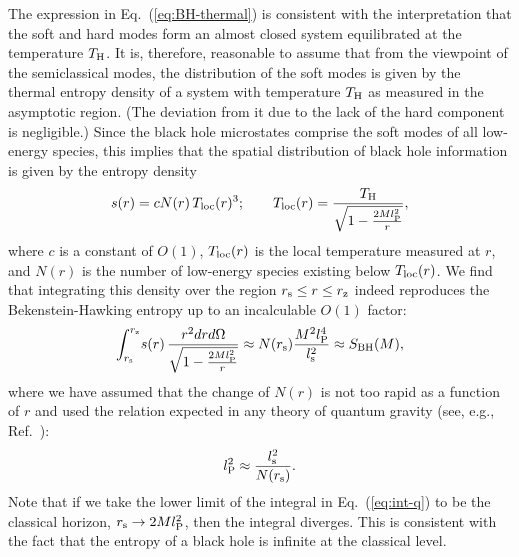 \documentclass[12pt]{article}
\begin{document}
The expression in Eq.~(\ref{eq:BH-thermal}) is consistent with the 
interpretation that the soft and hard modes form an almost closed 
system equilibrated at the temperature $T_{\rm H}$.  It is, 
therefore, reasonable to assume that from the viewpoint of the 
semiclassical modes, the distribution of the soft modes is given 
by the thermal entropy density of a system with temperature 
$T_{\rm H}$ as measured in the asymptotic region.  (The deviation 
from it due to the lack of the hard component is negligible.) 
Since the black hole microstates comprise the soft modes of all 
low-energy species, this implies that the spatial distribution 
of black hole information is given by the entropy density
%
\begin{equation}
  s(r) = c N(r)\, T_{\rm loc}(r)^3;
\qquad
  T_{\rm loc}(r) = \frac{T_{\rm H}}{\sqrt{1-\frac{2M l_{\rm P}^2}{r}}},
\label{eq:s-density}
\end{equation}
%
where $c$ is a constant of $O(1)$, $T_{\rm loc}(r)$ is the local 
temperature measured at $r$, and $N(r)$ is the number of low-energy 
species existing below $T_{\rm loc}(r)$.  We find that integrating 
this density over the region $r_{\rm s} \leq r \leq r_{\rm z}$ 
indeed reproduces the Bekenstein-Hawking entropy up to an 
incalculable $O(1)$ factor:
%
\begin{equation}
  \int_{r_{\rm s}}^{r_{\rm z}}\! s(r)\, 
    \frac{r^2 dr d\Omega}{\sqrt{1-\frac{2M l_{\rm P}^2}{r}}} 
  \approx N(r_{\rm s}) \frac{M^2 l_{\rm P}^4}{l_{\rm s}^2} 
  \approx S_{\rm BH}(M),
\label{eq:int-q}
\end{equation}
%
where we have assumed that the change of $N(r)$ is not too rapid as 
a function of $r$ and used the relation expected in any theory of 
quantum gravity (see, e.g., Ref.~\cite{Dvali:2007hz}):
%
\begin{equation}
  l_{\rm P}^2 \approx \frac{l_{\rm s}^2}{N(r_{\rm s})}.
\label{eq:qg-rel}
\end{equation}
%
Note that if we take the lower limit of the integral in 
Eq.~(\ref{eq:int-q}) to be the classical horizon, $r_{\rm s} 
\rightarrow 2M l_{\rm P}^2$, then the integral diverges.  This 
is consistent with the fact that the entropy of a black hole is 
infinite at the classical level.
\end{document}
